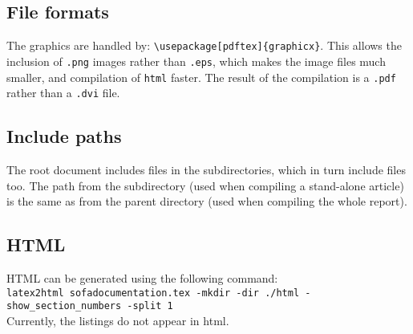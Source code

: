 \documentclass[a4paper,10pt]{report}
\begin{document}
\subsection{File formats}
The graphics are handled by: \texttt{\textbackslash usepackage[pdftex]\{graphicx\}}. This allows the inclusion of \texttt{.png} images rather than \texttt{.eps}, which makes the image files much smaller, and compilation of \texttt{html} faster. The result of the compilation is a \texttt{.pdf} rather than a \texttt{.dvi} file.

\subsection{Include paths}
The root document includes files in the subdirectories, which in turn include files too. The path from the subdirectory (used when compiling a stand-alone article) is the same as from the parent directory (used when compiling the whole report).

\subsection{HTML}
HTML can be generated using the following command:\\
\texttt{latex2html sofadocumentation.tex -mkdir -dir ./html -show\_section\_numbers -split 1}
\\
Currently, the listings do not appear in html.



\end{document}
